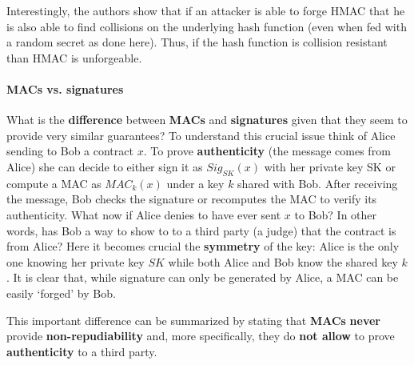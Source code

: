 Interestingly, the authors show that if an attacker is able to forge HMAC that he is also able to find collisions on the underlying hash function (even when fed with a random secret as done here). Thus, if the hash function is collision resistant than HMAC is unforgeable.

\paragraph{MACs vs. signatures} What is the \textbf{difference} between \textbf{MACs} and \textbf{signatures} given that they seem to provide very similar guarantees? To understand this crucial issue think of Alice sending to Bob a contract $x$. To prove \textbf{authenticity} (the message comes from Alice) she can decide to either sign it as $\mathit{Sig}_{SK}(x)$ with her private key SK or compute a MAC as $\mathit{MAC}_k(x)$ under a key $k$ shared with Bob. After receiving the message, Bob checks the signature or recomputes the MAC to verify its authenticity. What now if Alice denies to have ever sent $x$ to Bob? In other words, has Bob a way to show to to a third party (a judge) that the contract is from Alice? Here it becomes crucial the \textbf{symmetry} of the key: Alice is the only one knowing her private key $SK$ while both Alice and Bob know the shared key $k$. It is clear that, while signature can only be generated by Alice, a MAC can be easily ‘forged’ by Bob. 

This important difference can be summarized by stating that \textbf{MACs} \textbf{never} provide \textbf{non-repudiability} and, more specifically, they do \textbf{not allow} to prove \textbf{authenticity} to a third party.

\newpage
